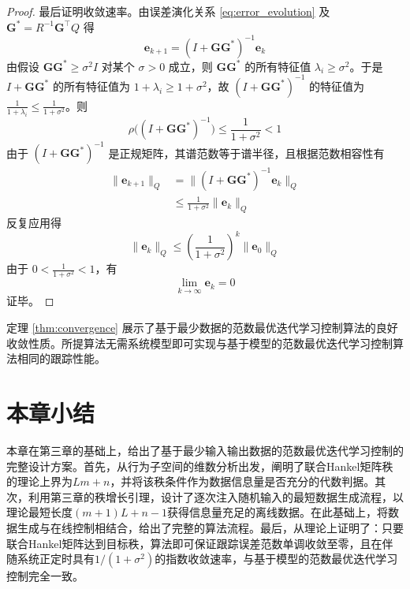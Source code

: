 \begin{proof}
	最后证明收敛速率。由误差演化关系 \eqref{eq:error_evolution} 及 $\mathbf{G}^* = R^{-1} \mathbf{G}^\top Q$ 得
	\begin{equation}
		\mathbf{e}_{k+1} = (I + \mathbf{G} \mathbf{G}^*)^{-1} \mathbf{e}_k
	\end{equation}
	由假设 $\mathbf{G} \mathbf{G}^* \geq \sigma^2 I$ 对某个 $\sigma > 0$ 成立，则 $\mathbf{G} \mathbf{G}^*$ 的所有特征值 $\lambda_i \ge \sigma^2$。于是 $I + \mathbf{G} \mathbf{G}^*$ 的所有特征值为 $1 + \lambda_i \ge 1 + \sigma^2$，故 $(I + \mathbf{G} \mathbf{G}^*)^{-1}$ 的特征值为 $\frac{1}{1+\lambda_i} \le \frac{1}{1+\sigma^2}$。则
	\begin{equation}
		\rho\bigl((I + \mathbf{G} \mathbf{G}^*)^{-1}\bigr) \le \frac{1}{1+\sigma^2} < 1
	\end{equation}
	由于 $(I + \mathbf{G} \mathbf{G}^*)^{-1}$ 是正规矩阵，其谱范数等于谱半径，且根据范数相容性有
\begin{equation}
	\begin{aligned}
		\|\mathbf{e}_{k+1}\|_Q &= \|(I + \mathbf{G} \mathbf{G}^*)^{-1} \mathbf{e}_k\|_Q \\
		&\le \frac{1}{1+\sigma^2} \|\mathbf{e}_k\|_Q
	\end{aligned}
\end{equation}
	反复应用得
	\begin{equation}
		\|\mathbf{e}_k\|_Q \le \left(\frac{1}{1+\sigma^2}\right)^k \|\mathbf{e}_0\|_Q
	\end{equation}
	由于 $0 < \frac{1}{1+\sigma^2} < 1$，有
	\begin{equation}
		\lim_{k\to\infty} \mathbf{e}_k = 0
	\end{equation}
	证毕。
\end{proof}

定理 \ref{thm:convergence} 展示了基于最少数据的范数最优迭代学习控制算法的良好收敛性质。所提算法无需系统模型即可实现与基于模型的范数最优迭代学习控制算法相同的跟踪性能。

\section{本章小结}

本章在第三章的基础上，给出了基于最少输入输出数据的范数最优迭代学习控制的完整设计方案。首先，从行为子空间的维数分析出发，阐明了联合Hankel矩阵秩的理论上界为$Lm+n$，并将该秩条件作为数据信息量是否充分的代数判据。其次，利用第三章的秩增长引理，设计了逐次注入随机输入的最短数据生成流程，以理论最短长度$(m+1)L+n-1$获得信息量充足的离线数据。在此基础上，将数据生成与在线控制相结合，给出了完整的算法流程。最后，从理论上证明了：只要联合Hankel矩阵达到目标秩，算法即可保证跟踪误差范数单调收敛至零，且在伴随系统正定时具有$1/(1+\sigma^2)$的指数收敛速率，与基于模型的范数最优迭代学习控制完全一致。